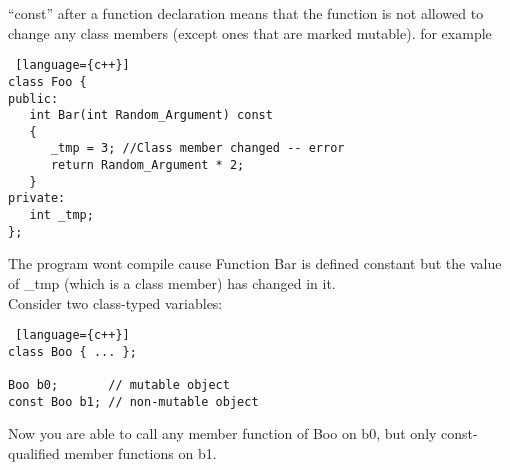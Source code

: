 \begin{note}

``const'' after a function declaration means that the function is not allowed to change any class members (except ones that are marked mutable). for example
\begin{lstlisting} [language={c++}]
class Foo {
public:
   int Bar(int Random_Argument) const
   {
      _tmp = 3; //Class member changed -- error
      return Random_Argument * 2;
   }
private:
   int _tmp;
};
\end{lstlisting}
The program wont compile cause Function Bar is defined constant but the value of \_tmp (which is a class member) has changed in it.\\

Consider two class-typed variables:
\begin{lstlisting} [language={c++}]
class Boo { ... };

Boo b0;       // mutable object
const Boo b1; // non-mutable object
\end{lstlisting}
Now you are able to call any member function of Boo on b0, but only const-qualified member functions on b1.
\end{note}

